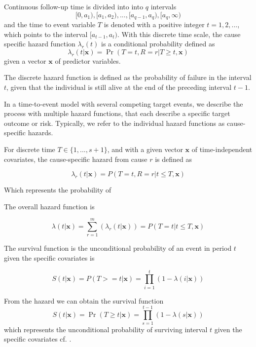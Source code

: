Continuous follow-up time is divided into into $q$ intervals
%
\begin{equation*}
	[0, a_1), [a_1, a_2), ..., [a_{q-1}, a_q), [a_{q}, \infty)
\end{equation*}
%
and the time to event variable \(T\) is denoted 
with a positive integer \(t = 1, 2, ...\),
which points to the interval \([a_{t-1}, a_{t})\).
With this discrete time scale,
the cause specific hazard function \(\lambda_{r}(t)\) is a conditional probability defined as
%
\begin{equation*}
    \lambda_{r}(t | \mathbf{x}) = \Pr (T = t, R = r | T \geq t, \mathbf{x})
\end{equation*}
%
given a vector \(\mathbf{x}\) of predictor variables.

The discrete hazard function is defined as
the probability of failure in the interval \(t\),
given that the individual is still alive at the end of the preceding interval
\(t - 1\).

In a time-to-event model with several competing target events,
we describe the process with multiple hazard functions, 
that each describe a specific target outcome or risk.
Typically, 
we refer to the individual hazard functions as cause-specific hazards.

For discrete time \(T \in \{1, ..., s+1\}\), and with a given vector \(\mathbf{x}\) of time-independent covariates,
the cause-specific hazard from cause \(r\) is defined as

\begin{equation}
    \lambda_{r}(t|\mathbf{x}) 
    = P(T = t, R = r | t \leq T, \mathbf{x})
\end{equation}

Which represents the probability of 

The overall hazard function is

\begin{equation}
    \lambda(t|\mathbf{x}) 
    = \sum_{r=1}^{m}(\lambda_{r}(t|\mathbf{x}))
    = P(T = t | t \leq T, \mathbf{x})
\end{equation}

The survival function is the unconditional probability of an event in period \(t\) given the specific covariates is 

\begin{equation}
    S(t|\mathbf{x})
    = P(T >= t|\mathbf{x})
    = \prod_{i=1}^{t}(1 - \lambda(i|\mathbf{x}))
\end{equation}

From the hazard we can obtain the survival function 
%
\begin{equation*}
    S(t | \mathbf{x}) 
    = \Pr (T \geq t | \mathbf{x}) 
    = \prod_{s = 1}^{t-1} (1 - \lambda(s | \mathbf{x}))
\end{equation*}
%
which represents the unconditional probability of surviving interval \(t\) given the specific covariates cf. \autocite{tutzModeling2016}.

